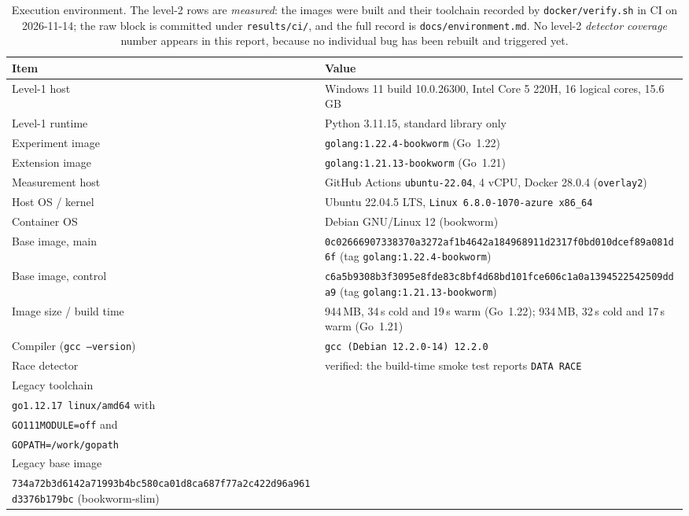 \documentclass[11pt]{article}
\begin{document}
\begin{table}[h]
\centering
\caption{Execution environment. The level-2 rows are \emph{measured}: the
images were built and their toolchain recorded by \texttt{docker/verify.sh}
in CI on 2026-11-14; the raw block is committed under \texttt{results/ci/},
and the full record is \texttt{docs/environment.md}. No level-2
\emph{detector coverage} number appears in this report, because no individual
bug has been rebuilt and triggered yet.}
\label{tab:environment}
\begin{tabular}{@{}p{}p{}@{}}
\toprule
Item & Value \\
\midrule
Level-1 host & Windows 11 build 10.0.26300, Intel Core 5 220H, 16 logical cores, 15.6\,GB \\
Level-1 runtime & Python 3.11.15, standard library only \\
Experiment image & \texttt{golang:1.22.4-bookworm} (Go~1.22) \\
Extension image & \texttt{golang:1.21.13-bookworm} (Go~1.21) \\
Measurement host & GitHub Actions \texttt{ubuntu-22.04}, 4 vCPU, Docker 28.0.4 (\texttt{overlay2}) \\
Host OS / kernel & Ubuntu 22.04.5 LTS, \texttt{Linux 6.8.0-1070-azure x86\_64} \\
Container OS & Debian GNU/Linux 12 (bookworm) \\
Base image, main & \nolinkurl{0c02666907338370a3272af1b4642a184968911d2317f0bd010dcef89a081d6f} (tag \texttt{golang:1.22.4-bookworm}) \\
Base image, control & \nolinkurl{c6a5b9308b3f3095e8fde83c8bf4d68bd101fce606c1a0a1394522542509dda9} (tag \texttt{golang:1.21.13-bookworm}) \\
Image size / build time & 944\,MB, 34\,s cold and 19\,s warm (Go~1.22); 934\,MB, 32\,s cold and 17\,s warm (Go~1.21) \\
Compiler (\texttt{gcc --version}) & \texttt{gcc (Debian 12.2.0-14) 12.2.0} \\
Race detector & verified: the build-time smoke test reports \texttt{DATA RACE} \\
Legacy toolchain & \\\texttt{go1.12.17 linux/amd64} with \\\texttt{GO111MODULE=off} and \\\texttt{GOPATH=/work/gopath} \\
Legacy base image & \\\nolinkurl{734a72b3d6142a71993b4bc580ca01d8ca687f77a2c422d96a961d3376b179bc} (bookworm-slim) \\

\end{tabular}
\end{table}
\end{document}
